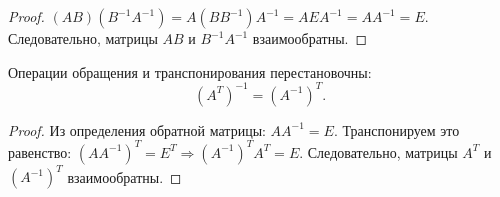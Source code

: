 \documentclass[10pt]{article}
\begin{document}
\begin{proof}
\((AB)(B^{-1}A^{-1}) = A(B B^{-1}) A^{-1} = A E A^{-1} = A A^{-1} = E\). Следовательно, матрицы \(AB\) и \(B^{-1}A^{-1}\) взаимообратны.
\end{proof}

\begin{property}
Операции обращения и транспонирования перестановочны:
\[
(A^{T})^{-1} = (A^{-1})^{T}.
\]
\end{property}

\begin{proof}
Из определения обратной матрицы: \(A A^{-1} = E\). Транспонируем это равенство: \((A A^{-1})^{T} = E^{T} \Rightarrow (A^{-1})^{T} A^{T} = E\). Следовательно, матрицы \(A^{T}\) и \((A^{-1})^{T}\) взаимообратны.
\end{proof}
\end{document}
